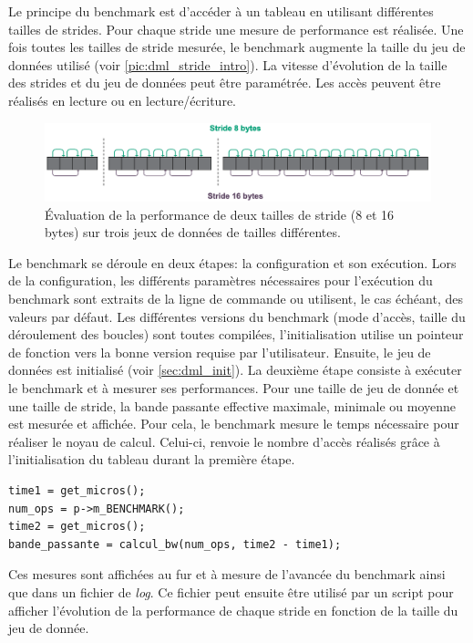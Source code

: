         Le principe du benchmark est d'accéder à un tableau en utilisant différentes tailles de strides. Pour chaque stride une mesure de performance est réalisée. Une fois toutes les tailles de stride mesurée, le benchmark augmente la taille du jeu de données utilisé (voir \autoref{pic:dml_stride_intro}). La vitesse d'évolution de la taille des strides et du jeu de données peut être paramétrée. Les accès peuvent être réalisés en lecture ou en lecture/écriture.
       
        \begin{figure}[h!]
        \center
        \includegraphics[width=14cm]{images/dml_stride_intro.png}
        \caption{\label{pic:dml_stride_intro}Évaluation de la performance de deux tailles de stride (8 et 16 bytes) sur trois jeux de données de tailles différentes.}
        \end{figure}


        Le benchmark se déroule en deux étapes: la configuration et son exécution.
        Lors de la configuration, les différents paramètres nécessaires pour l'exécution du benchmark sont extraits de la ligne de commande ou utilisent, le cas échéant, des valeurs par défaut. Les différentes versions du benchmark (mode d'accès, taille du déroulement des boucles) sont toutes compilées, l'initialisation utilise un pointeur de fonction vers la bonne version requise par l'utilisateur. Ensuite, le jeu de données est initialisé (voir \autoref{sec:dml_init}). 
        La deuxième étape consiste à exécuter le benchmark et à mesurer ses performances. Pour une taille de jeu de donnée et une taille de stride, la bande passante effective maximale, minimale ou moyenne est mesurée et affichée. Pour cela, le benchmark mesure le temps nécessaire pour réaliser le noyau de calcul. Celui-ci, renvoie le nombre d'accès réalisés grâce à l'initialisation du tableau durant la première étape. 
            \begin{verbatim}
time1 = get_micros();
num_ops = p->m_BENCHMARK();
time2 = get_micros();
bande_passante = calcul_bw(num_ops, time2 - time1);
            \end{verbatim}
            
        Ces mesures sont affichées au fur et à mesure de l'avancée du benchmark ainsi que dans un fichier de \textit{log}. Ce fichier peut ensuite être utilisé par un script pour afficher l'évolution de la performance de chaque stride en fonction de la taille du jeu de donnée. 
            
